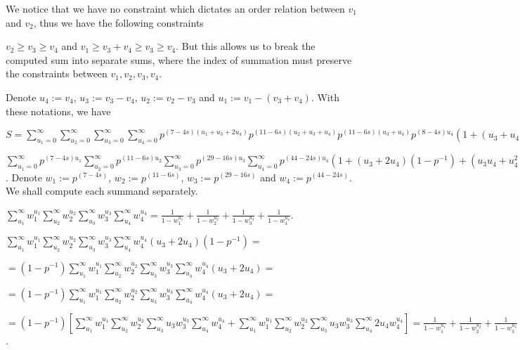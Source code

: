 \documentclass{article}
\begin{document}
We notice that we have no constraint which dictates an order relation between $v_{1}$ and $v_{2}$, thus we have the following constraints

$v_{2}\geq{v_{3}}\geq{v_{4}}$ and $v_{1}\geq{v_{3}+v_{4}}\geq{v_{3}}\geq{v_{4}}$. But this allows us to break the computed sum into separate sums, where the index of summation must preserve the constraints between $v_{1},v_{2},v_{3},v_{4}$.

Denote $u_{4}:=v_{4}$, $u_{3}:=v_{3}-v_{4}$, ${u_{2}:=v_{2}-v_{3}}$ and $u_{1}:=v_{1}-(v_{3}+v_{4})$. With these notations, we have 

$S=\sum_{u_{1}=0}^{\infty}\sum_{u_{2}=0}^{\infty}\sum_{u_{3}=0}^{\infty}\sum_{u_{4}=0}^{\infty}p^{(7-4s)(u_{1}+u_{3}+2u_{4})}p^{(11-6s)(u_{2}+u_{3}+u_{4})}p^{(11-6s)(u_{3}+u_{4})}p^{(8-4s)u_{4}}(1+(u_{3}+u_{4})(1-p^{-1}))(1+u_{4}(1-p^{-1}))=$

$\sum_{u_{1}=0}^{\infty}p^{(7-4s)u_{1}}\sum_{u_{2}=0}^{\infty}p^{(11-6s)u_{2}}\sum_{u_{3}=0}^{\infty}p^{(29-16s)u_{3}}\sum_{u_{4}=0}^{\infty}p^{(44-24s)u_{4}}(1+(u_{3}+2u_{4})(1-p^{-1})+(u_{3}u_{4}+u_{4}^{2}(1-p^{-1})))$.
Denote $w_{1}:=p^{(7-4s)}$, $w_{2}:=p^{(11-6s)}$, $w_{3}:=p^{(29-16s)}$ and $w_{4}:=p^{(44-24s)}$.
We shall compute each summand separately.

$\sum_{u_{1}}^{\infty}w_{1}^{u_{1}}\sum_{u_{2}}^{\infty}w_{2}^{u_{2}}\sum_{u_{3}}^{\infty}w_{3}^{u_{3}}\sum_{u_{4}}^{\infty}w_{4}^{u_{4}}=\frac{1}{1-w_{1}^{u_{1}}}+\frac{1}{1-w_{2}^{u_{2}}}+\frac{1}{1-w_{3}^{u_{3}}}+\frac{1}{1-w_{4}^{u_{4}}}$.

$\sum_{u_{1}}^{\infty}w_{1}^{u_{1}}\sum_{u_{2}}^{\infty}w_{2}^{u_{2}}\sum_{u_{3}}^{\infty}w_{3}^{u_{3}}\sum_{u_{4}}^{\infty}w_{4}^{u_{4}}(u_{3}+2u_{4})(1-p^{-1})=$

$=(1-p^{-1})\sum_{u_{1}}^{\infty}w_{1}^{u_{1}}\sum_{u_{2}}^{\infty}w_{2}^{u_{2}}\sum_{u_{3}}^{\infty}w_{3}^{u_{3}}\sum_{u_{4}}^{\infty}w_{4}^{u_{4}}(u_{3}+2u_{4})=$

$=(1-p^{-1})\sum_{u_{1}}^{\infty}w_{1}^{u_{1}}\sum_{u_{2}}^{\infty}w_{2}^{u_{2}}\sum_{u_{3}}^{\infty}w_{3}^{u_{3}}\sum_{u_{4}}^{\infty}w_{4}^{u_{4}}(u_{3}+2u_{4})=$

$=(1-p^{-1})[\sum_{u_{1}}^{\infty}w_{1}^{u_{1}}\sum_{u_{2}}^{\infty}w_{2}^{u_{2}}\sum_{u_{3}}^{\infty}u_{3}w_{3}^{u_{3}}\sum_{u_{4}}^{\infty}w_{4}^{u_{4}}+\sum_{u_{1}}^{\infty}w_{1}^{u_{1}}\sum_{u_{2}}^{\infty}w_{2}^{u_{2}}\sum_{u_{3}}^{\infty}u_{3}w_{3}^{u_{3}}\sum_{u_{4}}^{\infty}2u_{4}w_{4}^{u_{4}}]=\frac{1}{1-w_{1}^{u_{1}}}+\frac{1}{1-w_{2}^{u_{2}}}+\frac{1}{1-w_{3}^{u_{3}}}+\frac{1}{1-w_{4}^{u_{4}}}$.
\end{document}
